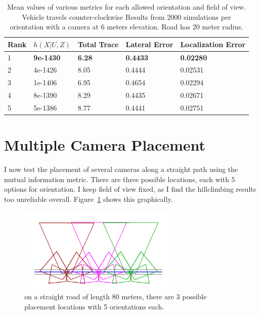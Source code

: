 \documentclass[a4paper,12pt,twoside,openright]{report}
\begin{document}
\begin{table}[htb]
    \centering
    \caption[Metrics for 20 Meter Curvature]{Mean values of various metrics for each allowed orientation and field of view. Vehicle travels counter-clockwise Results from 2000 simulations per orientation with a camera at 6 meters elevation. Road has 20 meter radius.}
    \label{tab:curvedroad multifov}
    \begin{tabular}{@{}lllll@{}}
        \toprule
        Rank & $h(X|U, Z)$ & Total Trace & Lateral Error & Localization Error \\ \midrule
        1    & \textbf{9e-1430}    & \textbf{6.28}        & \textbf{0.4433}        & \textbf{0.02280}              \\
        2    & 4e-1426    & 8.05        & 0.4444        & 0.02531 \\
        3    & 1e-1406    & 6.95        & 0.4654        & 0.02294     \\
        4    & 8e-1390    & 8.29        & 0.4435        & 0.02671     \\
        5    & 5e-1386    & 8.77        & 0.4441        & 0.02751     \\
    \end{tabular}
\end{table}

\section{Multiple Camera Placement}

I now test the placement of several cameras along a straight path using
the mutual information metric. There are three possible locations,
each with 5 options for orientation. I keep field of view fixed, as
I find the hillclimbing results too unreliable overall. Figure~\ref{fig:complexobjective:straightpre}
shows this graphically.

\begin{figure}[htb]
    \centering
    \includegraphics[width=3in]{figures/multi_placement/straightroad_80m_choices.png}
    \caption[Multi-camera Placement Choices]{on a straight road of length 80 meters, there are 3 possible placement locations
    with 5 orientations each.}
    \label{fig:complexobjective:straightpre}
\end{figure}
\end{document}
